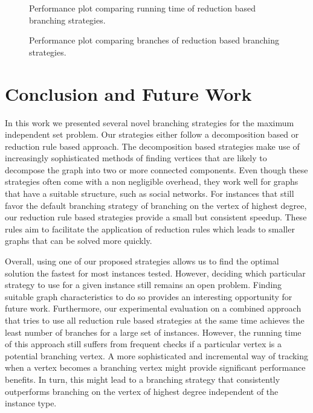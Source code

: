 \documentclass[a4paper,UKenglish,cleveref, autoref, thm-restate]{lipics-v2021}
\begin{document}

\begin{figure}[t]
	\centering
	
	\caption{Performance plot comparing running time of reduction based branching strategies.}
	\label{fig:all_reduction_time}
\end{figure}

\begin{figure}[tb!]
	\centering
	
	\caption{Performance plot comparing branches of reduction based branching strategies.}
	\label{fig:all_reduction_branch}
\end{figure}


\section{Conclusion and Future Work}
In this work we presented several novel branching strategies for the maximum independent set problem.
Our strategies either follow a decomposition based or reduction rule based approach.
The decomposition based strategies make use of increasingly sophisticated methods of finding vertices that are likely to decompose the graph into two or more connected components.
Even though these strategies often come with a non negligible overhead, they work well for graphs that have a suitable structure, such as social networks.
For instances that still favor the default branching strategy of branching on the vertex of highest degree, our reduction rule based strategies provide a small but consistent speedup.
These rules aim to facilitate the application of reduction rules which leads to smaller graphs that can be solved more quickly.

Overall, using one of our proposed strategies allows us to find the optimal solution the fastest for most instances tested.
However, deciding which particular strategy to use for a given instance still remains an open problem.
Finding suitable graph characteristics to do so provides an interesting opportunity for future work.
Furthermore, our experimental evaluation on a combined approach that tries to use all reduction rule based strategies at the same time achieves the least number of branches for a large set of instances.
However, the running time of this approach still suffers from frequent checks if a particular vertex is a potential branching vertex.
A more sophisticated and incremental way of tracking when a vertex becomes a branching vertex might provide significant performance benefits.
In turn, this might lead to a branching strategy that consistently outperforms branching on the vertex of highest degree independent of the instance type.
\end{document}
